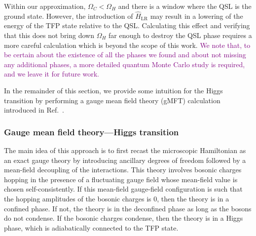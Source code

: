 \documentclass[twocolumn,superscriptaddress,amsmath,amssymb,aps,prx,nofootinbib]{revtex4-2}
\newcommand{\newtext}[1]{\textcolor{purple}{#1}}
\begin{document}
Within our approximation, $\Omega_C<\Omega_H$ and there is a window where the QSL is the ground state. However, the introduction of $\hat{H}_{\text{LR}}$ may result in a lowering of the energy of the TFP state relative to the QSL. Calculating this effect and verifying that this does not bring down $\Omega_H$ far enough to destroy the QSL phase requires a more careful calculation which is beyond the scope of this work.
\newtext{We note that, to be certain about the existence of all the phases we found and about not missing any additional phases, a more detailed quantum Monte Carlo study is required, and we leave it for future work.}

In the remainder of this section, we provide some intuition for the Higgs transition by performing a gauge mean field theory (gMFT) calculation introduced in Ref.~\cite{savary2012coulombic}. 

\subsubsection{Gauge mean field theory---Higgs transition}\label{sec:gmft}
The main idea of this approach is to first recast the microscopic Hamiltonian as an exact gauge theory by introducing ancillary degrees of freedom followed by a mean-field decoupling of the interactions. This theory involves bosonic charges hopping in the presence of a fluctuating gauge field whose mean-field value is chosen self-consistently. If this mean-field gauge-field configuration is such that the hopping amplitudes of the bosonic charges is 0, then the theory is in a confined phase. If not, the theory is in the deconfined phase as long as the bosons do not condense. If the bosonic charges condense, then the theory is in a Higgs phase, which is adiabatically connected to the TFP state.
\end{document}
